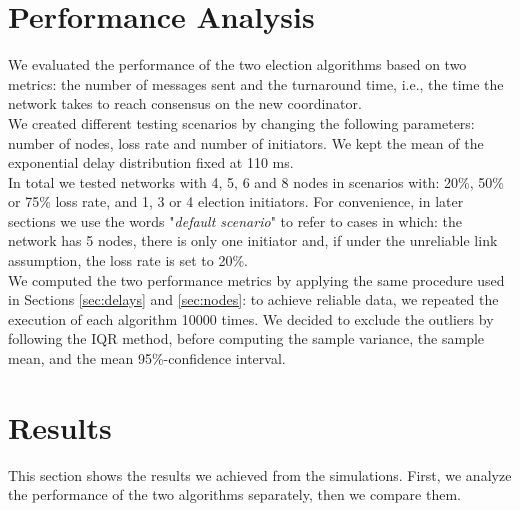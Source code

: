 \documentclass[10pt,journal,compsoc]{IEEEtran}
\begin{document}
\section{Performance Analysis}
We evaluated the performance of the two election algorithms based on two
metrics: the number of messages sent and the turnaround time, i.e., the time the
network takes to reach consensus on the new coordinator.
\\We created different testing scenarios by changing the following parameters:
number of nodes, loss rate and number of initiators. We kept the mean of the
exponential delay distribution fixed at 110 ms.\\
In total we tested networks with 4, 5, 6 and 8 nodes in scenarios with: 20\%,
50\% or 75\% loss rate, and 1, 3 or 4 election initiators.
For convenience, in later sections we use the words "\textit{default scenario}"
to refer to cases in which: the network has 5 nodes, there is only one initiator
and, if under the unreliable link assumption, the loss rate is set to 20\%. 
\\We computed the two performance metrics by applying the same procedure used in
Sections \ref{sec:delays} and \ref{sec:nodes}: to achieve reliable data, we
repeated the execution of each algorithm 10000 times. We decided to exclude the
outliers by following the IQR method, before computing the sample variance, the
sample mean, and the mean 95\%-confidence interval. 
\section{Results}
This section shows the results we achieved from the simulations. First, we
analyze the performance of the two algorithms separately, then we compare them.
\end{document}
